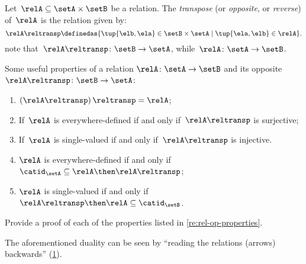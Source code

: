 \begin{definition}
  \label{def:relation-transpose}
  Let~$\relA\subseteq \setA\times \setB$ be a relation. The \emph{transpose} (or \emph{opposite}, or \emph{reverse}) of~$\relA$ is the relation given by:
  \begin{equation*}
    \relA\reltransp \definedas \{\tup{\elb,\ela}\in \setB\times \setA \mid \tup{\ela,\elb}\in \relA \}.
  \end{equation*}
  note that~$\relA\reltransp\colon \setB\to \setA$, while~$\relA\colon \setA\to \setB$.
\end{definition}
\begin{remark}\label{re:rel-op-properties}
  Some useful properties of a relation $\relA\colon \setA\to \setB$  and its opposite $\relA\reltransp\colon \setB\to \setA$:  \begin{enumerate}
    \item $\left(\relA\reltransp\right)\reltransp = \relA $;
    \item If~$\relA$ is everywhere-defined if and only if~$\relA\reltransp$ is surjective;
    \item If~$\relA$ is single-valued if and only if~$\relA\reltransp$ is injective.
    \item $\relA$ is everywhere-defined if and only if~$\catid_\setA\subseteq \relA \then \relA\reltransp$;
    \item $\relA$ is single-valued if and only if~$\relA\reltransp\then \relA\subseteq \catid_\setB$.
  \end{enumerate}
\end{remark}

\begin{gradedexercise}\label{ex:RelProperties}
Provide a proof of each of the properties listed in \cref{re:rel-op-properties}.
\end{gradedexercise}



\begin{remark}
  The aforementioned duality can be seen by ``reading the relations (arrows) backwards'' (\cref{fig:rel_transpose}).
\end{remark}

\begin{figure}[h!]
  \centering
  \caption{}
  \label{fig:rel_transpose}
\end{figure}
